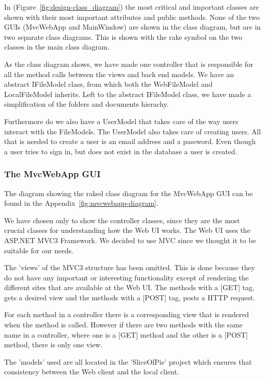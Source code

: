 In (Figure~\ref{fig:design-class_diagram}) the most critical and important classes are shown with their most important attributes and public methods.
None of the two GUIs (MvcWebApp and MainWindow) are shown in the class diagram, but are in two separate class diagrams. This is shown with the rake
symbol on the two classes in the main class diagram.

As the class diagram shows, we have made one controller that is responsible for all the method calls between the views and back end models. We have an abstract
IFileModel class, from which both the WebFileModel and LocalFileModel inherits. Left to the abstract IFileModel class, we have made a simplification of the folders and 
documents hierachy. 

Furthermore do we also have a UserModel that takes care of the way users interact with the FileModels. The UserModel also takes care of creating users. All that is needed
to create a user is an email address and a password. Even though a user tries to sign in, but does not exist in the database a user is created.

\subsubsection{The MvcWebApp GUI}

The diagram showing the raked class diagram for the MvcWebApp GUI can be found in the Appendix~\ref{fig:mvcwebapp-diagram}.

We have chosen only to show the controller classes, since they are the most crucial classes for understanding how the Web UI works. The Web UI uses
the ASP.NET MVC3 Framework. We decided to use MVC since we thought it to be suitable for our needs.

The 'views' of the MVC3 structure has been omitted. This is done because they do not have any important or interesting functionality except of rendering
the different sites that are available at the Web UI. The methods with a [GET] tag, gets a desired view and the methods with a [POST] tag, posts a HTTP request.

For each method in a controller there is a corresponding view that is rendered when the method is called. However if there are two methods with the same 
name in a controller, where one is a [GET] method and the other is a [POST] method, there is only one view.

The 'models' used are all located in the 'SliceOfPie' project which ensures that consistency between the Web client and the local client.


